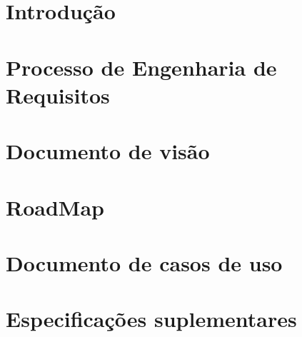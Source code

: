 
\section{Introdução} %
\label{sec:introdu_o}
 

\section{Processo de Engenharia de Requisitos}
\label{sec:processo}


\section{Documento de visão}
\label{sec:document_de_visao}


\section{RoadMap}
\label{sec:road_map}


\section{Documento de casos de uso}
\label{sec:documento_de_caso_de_uso}


\section{Especificações suplementares}
\label{sec:especificacoes_suplementares}
